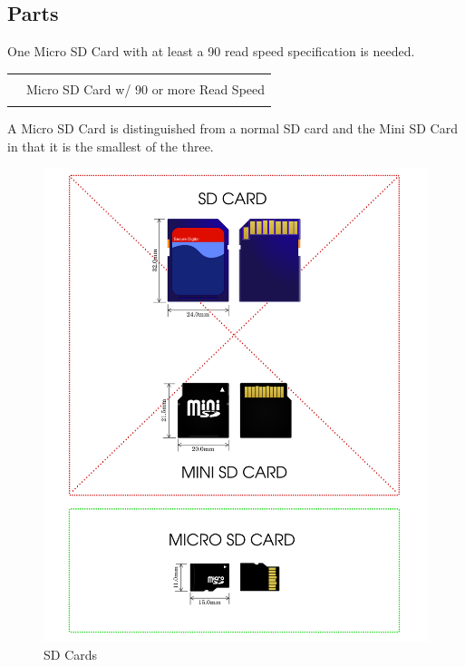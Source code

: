 

\subsection{Parts}

One Micro SD Card with at least a \num{90}  read speed specification
is needed.

\begin{table}[H]
\centering
\begin{tabu} { X[1,r,m] | X[6,l,m] }
  \thrule
   &  \\  & Micro SD Card w/ \num{90}  or more Read Speed \\
  \bhrule
\end{tabu}
\end{table}

A Micro SD Card is distinguished from a normal SD card and the Mini SD Card in
that it is the smallest of the three.

\begin{figure}[H]
\centering
  \includegraphics{images/sd_cards.png}
\caption{SD Cards}
\end{figure}


